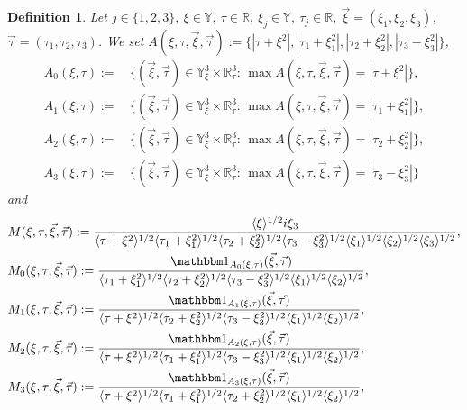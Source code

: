 \documentclass[reqno]{amsart}
\theoremstyle{Definitionl}
\theoremstyle{Definitionk}
\newtheorem{defk}[defi]{Definition}
\theoremstyle{definition}
\theoremstyle{Satzk}
\theoremstyle{Satzl}
\theoremstyle{Bemerkung}
\begin{document}
\begin{defk}\label{M}
Let $j\in\{1,2,3\},\ \xi\in\mathbb Y,\ \tau\in\mathbb R,\ \xi_j\in\mathbb Y,\ \tau_j\in\mathbb R,\ \vec\xi=(\xi_1,\xi_2,\xi_3)$, $\vec\tau=(\tau_1,\tau_2,\tau_3)$. We set $A(\xi,\tau,\vec\xi,\vec\tau):=\{|\tau+\xi^2|,|\tau_1+\xi_1^2|,|\tau_2+\xi_2^2|,|\tau_3-\xi_3^2|\}$,
\begin{align*}
A_0(\xi,\tau):=&\,\big\{(\vec\xi,\vec\tau)\in\mathbb Y^3_\xi\times\mathbb R^3_\tau:\,\max A(\xi,\tau,\vec\xi,\vec\tau)=|\tau+\xi^2|\big\},\\
A_1(\xi,\tau):=&\,\big\{(\vec\xi,\vec\tau)\in\mathbb Y^3_\xi\times\mathbb R^3_\tau:\,\max A(\xi,\tau,\vec\xi,\vec\tau)=|\tau_1+\xi_1^2|\big\},\\
A_2(\xi,\tau):=&\,\big\{(\vec\xi,\vec\tau)\in\mathbb Y^3_\xi\times\mathbb R^3_\tau:\,\max A(\xi,\tau,\vec\xi,\vec\tau)=|\tau_2+\xi_2^2|\big\},\\
A_3(\xi,\tau):=&\,\big\{(\vec\xi,\vec\tau)\in\mathbb Y^3_\xi\times\mathbb R^3_\tau:\,\max A(\xi,\tau,\vec\xi,\vec\tau)=|\tau_3-\xi_3^2|\big\}
\end{align*}and
\begin{align*}
&M(\xi,\tau,\vec\xi,\vec\tau):= \frac{\langle\xi\rangle^{1/2}i\xi_3}{\langle\tau+\xi^2\rangle^{1/2}\langle\tau_1+\xi_1^2\rangle^{1/2}\langle\tau_2+\xi_2^2\rangle^{1/2}\langle\tau_3-\xi_3^2\rangle^{1/2}\langle\xi_1\rangle^{1/2}\langle\xi_2\rangle^{1/2}\langle\xi_3\rangle^{1/2}},\\
&M_0(\xi,\tau,\vec\xi,\vec\tau):= \frac{\mathbbm1_{A_0(\xi,\tau)}(\vec\xi,\vec\tau)}{\langle\tau_1+\xi_1^2\rangle^{1/2}\langle\tau_2+\xi_2^2\rangle^{1/2}\langle\tau_3-\xi_3^2\rangle^{1/2}\langle\xi_1\rangle^{1/2}\langle\xi_2\rangle^{1/2}},\\
&M_1(\xi,\tau,\vec\xi,\vec\tau):= \frac{\mathbbm1_{A_1(\xi,\tau)}(\vec\xi,\vec\tau)}{\langle\tau+\xi^2\rangle^{1/2}\langle\tau_2+\xi_2^2\rangle^{1/2}\langle\tau_3-\xi_3^2\rangle^{1/2}\langle\xi_1\rangle^{1/2}\langle\xi_2\rangle^{1/2}},\\
&M_2(\xi,\tau,\vec\xi,\vec\tau):= \frac{\mathbbm1_{A_2(\xi,\tau)}(\vec\xi,\vec\tau)}{\langle\tau+\xi^2\rangle^{1/2}\langle\tau_1+\xi_1^2\rangle^{1/2}\langle\tau_3-\xi_3^2\rangle^{1/2}\langle\xi_1\rangle^{1/2}\langle\xi_2\rangle^{1/2}},\\
&M_3(\xi,\tau,\vec\xi,\vec\tau):= \frac{\mathbbm1_{A_3(\xi,\tau)}(\vec\xi,\vec\tau)}{\langle\tau+\xi^2\rangle^{1/2}\langle\tau_1+\xi_1^2\rangle^{1/2}\langle\tau_2+\xi_2^2\rangle^{1/2}\langle\xi_1\rangle^{1/2}\langle\xi_2\rangle^{1/2}},\\

\end{align*}
\end{defk}
\end{document}
